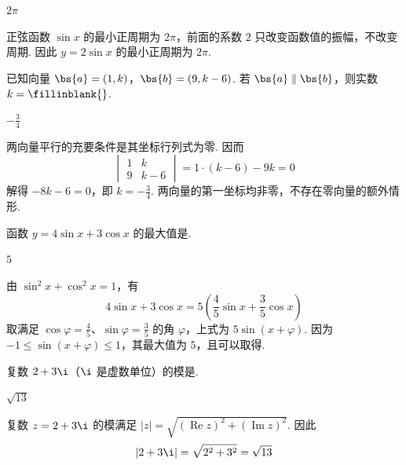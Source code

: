 \begin{answer}
\(2\pi\)
\end{answer}

\begin{solution}
正弦函数 \(\sin x\) 的最小正周期为 \(2\pi\)，前面的系数 \(2\) 只改变函数值的振幅，不改变周期. 因此 \(y=2\sin x\) 的最小正周期为 \(2\pi\).
\end{solution}

\begin{problem}
已知向量 \( \bs{a} = (1, k) \)，\( \bs{b} = (9, k - 6) \). 若 \( \bs{a} \parallel \bs{b} \)，则实数 \( k =\fillinblank{}\).
\end{problem}

\begin{answer}
\(-\frac{3}{4}\)
\end{answer}

\begin{solution}
两向量平行的充要条件是其坐标行列式为零. 因而
\[
\begin{vmatrix}1&k\\9&k-6\end{vmatrix}=1\cdot(k-6)-9k=0
\]
解得 \(-8k-6=0\)，即 \(k=-\frac34\). 两向量的第一坐标均非零，不存在零向量的额外情形.
\end{solution}

\begin{problem}
函数 \( y = 4 \sin x + 3 \cos x \) 的最大值是\fillinblank{}.
\end{problem}

\begin{answer}
\(5\)
\end{answer}

\begin{solution}
由 \(\sin^2x+\cos^2x=1\)，有
\[
4\sin x+3\cos x=5\left(\frac45\sin x+\frac35\cos x\right)
\]
取满足 \(\cos\varphi=\frac45\)、\(\sin\varphi=\frac35\) 的角 \(\varphi\)，上式为 \(5\sin(x+\varphi)\). 因为 \(-1\le\sin(x+\varphi)\le1\)，其最大值为 \(5\)，且可以取得.
\end{solution}

\begin{problem}
复数 \( 2+3\i \)（\( \i \) 是虚数单位）的模是\fillinblank{}.
\end{problem}

\begin{answer}
\(\sqrt{13}\)
\end{answer}

\begin{solution}
复数 \(z=2+3\i\) 的模满足 \(|z|=\sqrt{(\operatorname{Re}z)^2+(\operatorname{Im}z)^2}\). 因此
\[
|2+3\i|=\sqrt{2^2+3^2}=\sqrt{13}
\]
\end{solution}

